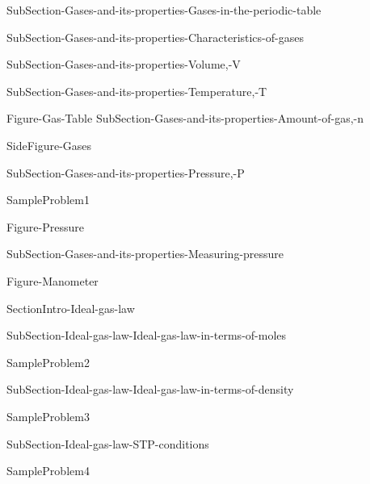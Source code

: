 \documentclass[main.tex]{subfiles}
\begin{document}
\sloppy 
\begin{description}

 {SubSection-Gases-and-its-properties-Gases-in-the-periodic-table}

 {SubSection-Gases-and-its-properties-Characteristics-of-gases}



 {SubSection-Gases-and-its-properties-Volume,-V}


 {SubSection-Gases-and-its-properties-Temperature,-T}





 {Figure-Gas-Table}
 {SubSection-Gases-and-its-properties-Amount-of-gas,-n}

 {SideFigure-Gases}


 {SubSection-Gases-and-its-properties-Pressure,-P}










{SampleProblem1}


 {Figure-Pressure}





 {SubSection-Gases-and-its-properties-Measuring-pressure}








\end{description}



 {Figure-Manometer}






 {SectionIntro-Ideal-gas-law}

\sloppy 
\begin{description}
 {SubSection-Ideal-gas-law-Ideal-gas-law-in-terms-of-moles}



{SampleProblem2}

 {SubSection-Ideal-gas-law-Ideal-gas-law-in-terms-of-density}







{SampleProblem3}

 {SubSection-Ideal-gas-law-STP-conditions}




{SampleProblem4}

\end{description}
\end{document}
